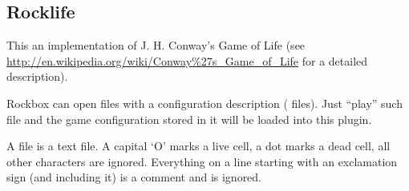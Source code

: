 \subsection{Rocklife}

This an implementation of J. H. Conway's Game of Life (see
\url{http://en.wikipedia.org/wiki/Conway\%27s_Game_of_Life} for a detailed
description).

Rockbox can open files with a configuration description ( files).
Just ``play'' such file and the game configuration stored in it will be loaded
into this plugin.

A  file is a text file. A capital `O' marks a live cell, a dot
marks a dead cell, all other characters are ignored. Everything on a line
starting with an exclamation sign (and including it) is a comment and is
ignored.
